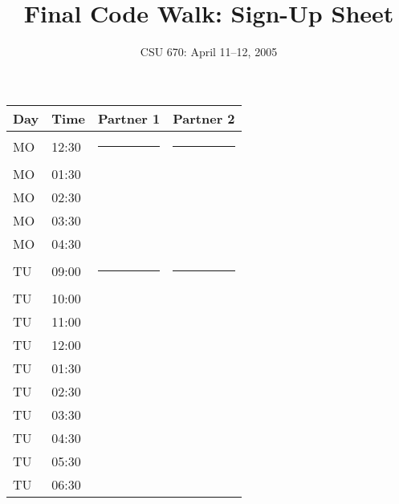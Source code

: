 \documentclass[11pt]{article}
\begin{document}
\title{Final Code Walk: Sign-Up Sheet}
\author{CSU 670: April 11--12, 2005}

\maketitle

\noindent\begin{tabular}{l|l|l|l} \hline
Day & Time & Partner 1 & Partner 2 \\ \hline \hline
 MO & 12:30&\rule{0pt}{22pt} \rule{2in}{0pt} & \rule{2in}{0pt} \\ \hline 
 MO & 01:30&\rule{0pt}{22pt} \\ \hline 
 MO & 02:30&\rule{0pt}{22pt} \\ \hline 
 MO & 03:30&\rule{0pt}{22pt} \\ \hline 
 MO & 04:30&\rule{0pt}{22pt} \\ \hline 

 TU & 09:00&\rule{0pt}{22pt} \rule{2in}{0pt} & \rule{2in}{0pt} \\ \hline 
 TU & 10:00&\rule{0pt}{22pt} \\ \hline 
 TU & 11:00&\rule{0pt}{22pt} \\ \hline 
 TU & 12:00&\rule{0pt}{22pt} \\ \hline 
 TU & 01:30&\rule{0pt}{22pt} \\ \hline 
 TU & 02:30&\rule{0pt}{22pt} \\ \hline 
 TU & 03:30&\rule{0pt}{22pt} \\ \hline 
 TU & 04:30&\rule{0pt}{22pt} \\ \hline 
 TU & 05:30&\rule{0pt}{22pt} \\ \hline 
 TU & 06:30&\rule{0pt}{22pt} \\ \hline 
\end{tabular}

\thispagestyle{empty}
\end{document}
